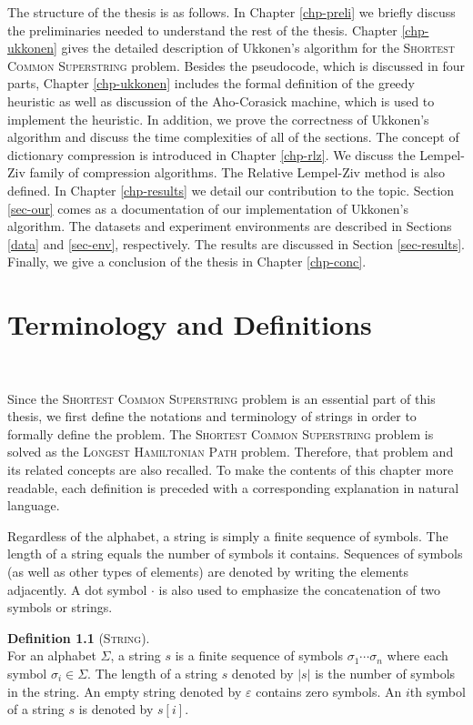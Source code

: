 \documentclass[english,twoside,censored,csm,algorithms-track-2020]{HYthesisML}
\theoremstyle{plain}
\theoremstyle{definition}
\newtheorem{definition}[theorem]{Definition}
\begin{document}
The structure of the thesis is as follows. In Chapter \ref{chp-preli} we briefly discuss the
preliminaries needed to understand the rest of the thesis. Chapter \ref{chp-ukkonen} gives the detailed
description of Ukkonen's algorithm for the \textsc{Shortest Common Superstring} problem.
Besides the pseudocode, which is discussed in four parts, Chapter \ref{chp-ukkonen} includes the
formal definition of the greedy heuristic as well as discussion of the Aho-Corasick machine,
which is used to implement the heuristic. In addition, we prove the correctness of Ukkonen's algorithm
and discuss the time complexities of all of the sections. The concept of dictionary compression is
introduced in Chapter \ref{chp-rlz}. We discuss the Lempel-Ziv family of compression algorithms. The
Relative Lempel-Ziv method is also defined. In Chapter \ref{chp-results} we detail our contribution to
the topic. Section \ref{sec-our} comes as a documentation of our implementation of Ukkonen's
algorithm. The datasets and experiment environments are described in Sections \ref{data} and
\ref{sec-env}, respectively. The results are discussed in Section \ref{sec-results}.
Finally, we give a conclusion of the thesis in Chapter \ref{chp-conc}.


\chapter{Terminology and Definitions}~\label{chp-preli}

Since the \textsc{Shortest Common Superstring} problem is an essential part of this thesis, we
first define the notations and terminology of strings in order to formally define the problem.
The \textsc{Shortest Common Superstring} problem is solved as the \textsc{Longest Hamiltonian Path}
problem. Therefore, that problem and its related concepts are also recalled.
To make the contents of this chapter more readable,
each definition is preceded with a corresponding explanation in natural language.

Regardless of the alphabet, a string is simply a finite sequence of symbols.
The length of a string equals the number of symbols it contains. Sequences of symbols
(as well as other types of elements) are denoted by writing the elements adjacently.
A dot symbol $\cdot$ is also used to emphasize the concatenation of two symbols or strings.

\begin{definition}[\textsc{String}]~\label{def-string}\\
  For an alphabet $\Sigma$, a string $s$ is a finite sequence of symbols  ${\sigma_1\cdots \sigma_n}$ where each symbol $\sigma_i \in \Sigma$.
  The length of a string $s$ denoted by $|s|$ is the number of symbols in the string.
  An empty string denoted by $\varepsilon$ contains zero symbols. An $i$th symbol of a string $s$
  is denoted by $s[i]$.
\end{definition}
\end{document}
